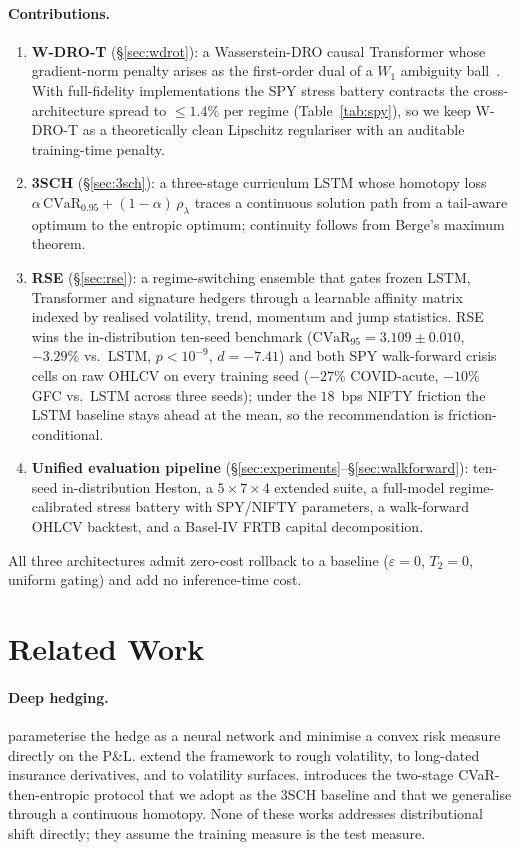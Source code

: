 \documentclass[10pt,letterpaper]{article}
\newcommand{\cvar}{\mathrm{CVaR}}
\newcommand{\Wone}{W_{1}}
\begin{document}
\paragraph{Contributions.}
\begin{enumerate}
\item \textbf{W-DRO-T} (\S\ref{sec:wdrot}): a Wasserstein-DRO
causal Transformer whose gradient-norm penalty arises as the
first-order dual of a $\Wone$ ambiguity
ball~\citep{blanchet2019quantifying}. With full-fidelity
implementations the SPY stress battery contracts the
cross-architecture spread to $\le 1.4\%$ per regime
(Table~\ref{tab:spy}), so we keep W-DRO-T as a theoretically clean
Lipschitz regulariser with an auditable training-time penalty.
\item \textbf{3SCH} (\S\ref{sec:3sch}): a three-stage curriculum
LSTM whose homotopy loss
$\alpha\,\cvar_{0.95} + (1-\alpha)\,\rho_\lambda$ traces a
continuous solution path from a tail-aware optimum to the entropic
optimum; continuity follows from Berge's maximum theorem.
\item \textbf{RSE} (\S\ref{sec:rse}): a regime-switching ensemble
that gates frozen LSTM, Transformer and signature hedgers through
a learnable affinity matrix indexed by realised volatility, trend,
momentum and jump statistics. RSE wins the in-distribution
ten-seed benchmark ($\cvar_{95}=3.109\pm 0.010$, $-3.29\%$ vs.\
LSTM, $p<10^{-9}$, $d=-7.41$) and both SPY walk-forward crisis
cells on raw OHLCV on every training seed ($-27\%$ COVID-acute,
$-10\%$ GFC vs.\ LSTM across three seeds); under the $18$~bps
NIFTY friction the LSTM baseline stays ahead at the mean, so the
recommendation is friction-conditional.
\item \textbf{Unified evaluation pipeline}
(\S\ref{sec:experiments}--\S\ref{sec:walkforward}): ten-seed
in-distribution Heston, a $5{\times}7{\times}4$ extended suite, a
full-model regime-calibrated stress battery with SPY/NIFTY
parameters, a walk-forward OHLCV backtest, and a Basel-IV FRTB
capital decomposition.
\end{enumerate}

All three architectures admit zero-cost rollback to a baseline
($\varepsilon{=}0$, $T_2{=}0$, uniform gating) and add no
inference-time cost.

\section{Related Work}\label{sec:related}

\paragraph{Deep hedging.}
\citet{buehler2019deep} parameterise the hedge as a neural network
and minimise a convex risk measure directly on the P\&L.
\citet{horvath2021deep} extend the framework to rough volatility,
\citet{carbonneau2021deep} to long-dated insurance derivatives, and
\citet{imaki2021deep} to volatility surfaces.
\citet{kozyra2019deep} introduces the two-stage CVaR-then-entropic
protocol that we adopt as the 3SCH baseline and that we generalise
through a continuous homotopy. None of these works addresses
distributional shift directly; they assume the training measure is
the test measure.
\end{document}
